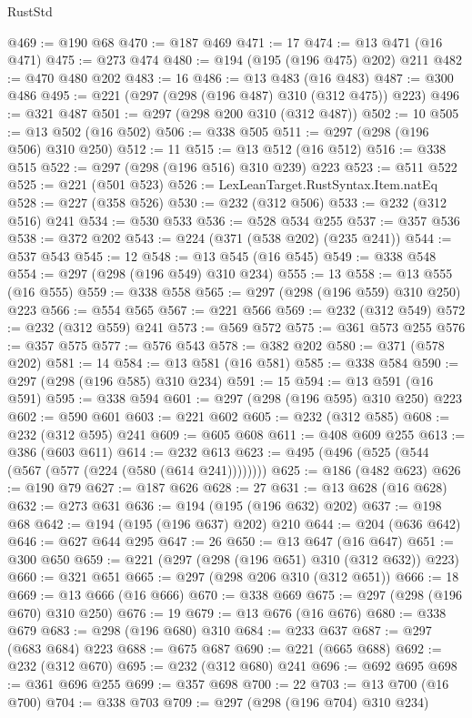\begin{lexlean}{RustStd}
\begin{coremodule}
@469 := @190 @68
@470 := @187 @469
@471 := 17
@474 := @13 @471 (@16 @471)
@475 := @273 @474
@480 := @194 (@195 (@196 @475) @202) @211
@482 := @470 @480 @202
@483 := 16
@486 := @13 @483 (@16 @483)
@487 := @300 @486
@495 := @221 (@297 (@298 (@196 @487) @310 (@312 @475)) @223)
@496 := @321 @487
@501 := @297 (@298 @200 @310 (@312 @487))
@502 := 10
@505 := @13 @502 (@16 @502)
@506 := @338 @505
@511 := @297 (@298 (@196 @506) @310 @250)
@512 := 11
@515 := @13 @512 (@16 @512)
@516 := @338 @515
@522 := @297 (@298 (@196 @516) @310 @239) @223
@523 := @511 @522
@525 := @221 (@501 @523)
@526 := LexLeanTarget.RustSyntax.Item.natEq
@528 := @227 (@358 @526)
@530 := @232 (@312 @506)
@533 := @232 (@312 @516) @241
@534 := @530 @533
@536 := @528 @534 @255
@537 := @357 @536
@538 := @372 @202
@543 := @224 (@371 (@538 @202) (@235 @241))
@544 := @537 @543
@545 := 12
@548 := @13 @545 (@16 @545)
@549 := @338 @548
@554 := @297 (@298 (@196 @549) @310 @234)
@555 := 13
@558 := @13 @555 (@16 @555)
@559 := @338 @558
@565 := @297 (@298 (@196 @559) @310 @250) @223
@566 := @554 @565
@567 := @221 @566
@569 := @232 (@312 @549)
@572 := @232 (@312 @559) @241
@573 := @569 @572
@575 := @361 @573 @255
@576 := @357 @575
@577 := @576 @543
@578 := @382 @202
@580 := @371 (@578 @202)
@581 := 14
@584 := @13 @581 (@16 @581)
@585 := @338 @584
@590 := @297 (@298 (@196 @585) @310 @234)
@591 := 15
@594 := @13 @591 (@16 @591)
@595 := @338 @594
@601 := @297 (@298 (@196 @595) @310 @250) @223
@602 := @590 @601
@603 := @221 @602
@605 := @232 (@312 @585)
@608 := @232 (@312 @595) @241
@609 := @605 @608
@611 := @408 @609 @255
@613 := @386 (@603 @611)
@614 := @232 @613
@623 := @495 (@496 (@525 (@544 (@567 (@577 (@224 (@580 (@614 @241))))))))
@625 := @186 (@482 @623)
@626 := @190 @79
@627 := @187 @626
@628 := 27
@631 := @13 @628 (@16 @628)
@632 := @273 @631
@636 := @194 (@195 (@196 @632) @202)
@637 := @198 @68
@642 := @194 (@195 (@196 @637) @202) @210
@644 := @204 (@636 @642)
@646 := @627 @644 @295
@647 := 26
@650 := @13 @647 (@16 @647)
@651 := @300 @650
@659 := @221 (@297 (@298 (@196 @651) @310 (@312 @632)) @223)
@660 := @321 @651
@665 := @297 (@298 @206 @310 (@312 @651))
@666 := 18
@669 := @13 @666 (@16 @666)
@670 := @338 @669
@675 := @297 (@298 (@196 @670) @310 @250)
@676 := 19
@679 := @13 @676 (@16 @676)
@680 := @338 @679
@683 := @298 (@196 @680) @310
@684 := @233 @637
@687 := @297 (@683 @684) @223
@688 := @675 @687
@690 := @221 (@665 @688)
@692 := @232 (@312 @670)
@695 := @232 (@312 @680) @241
@696 := @692 @695
@698 := @361 @696 @255
@699 := @357 @698
@700 := 22
@703 := @13 @700 (@16 @700)
@704 := @338 @703
@709 := @297 (@298 (@196 @704) @310 @234)

\end{coremodule}
\end{lexlean}
